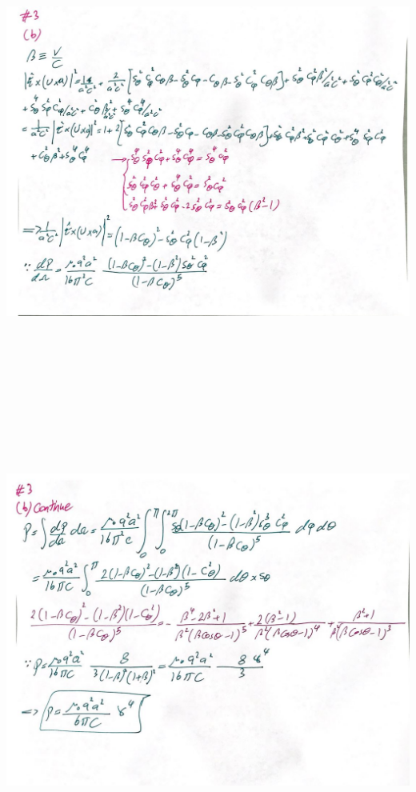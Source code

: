 \documentclass[fleqn]{article}
\begin{document}
\begin{enumerate}
    \begin{center}
      \includegraphics[height=15cm, width=16cm]{3B(A).JPG}
    \end{center}

    \pagebreak

    \begin{center}
      \includegraphics[height=15cm, width=16cm]{3B(B).JPG}
    \end{center}
    

\end{enumerate}
\end{document}
